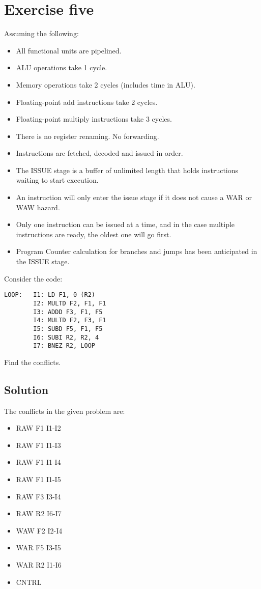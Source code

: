\section{Exercise five}

Assuming the following:
\begin{itemize}
    \item All functional units are pipelined.
    \item ALU operations take 1 cycle.
    \item Memory operations take 2 cycles (includes time in ALU).
    \item Floating-point add instructions take 2 cycles.
    \item Floating-point multiply instructions take 3 cycles.
    \item There is no register renaming. No forwarding.
    \item Instructions are fetched, decoded and issued in order.
    \item The ISSUE stage is a buffer of unlimited length that holds instructions waiting to start execution.
    \item An instruction will only enter the issue stage if it does not cause a WAR or WAW hazard.
    \item Only one instruction can be issued at a time, and in the case multiple instructions are ready, the oldest one will go first.
    \item Program Counter calculation for branches and jumps has been anticipated in the ISSUE stage.
\end{itemize}
Consider the code:
\begin{verbatim}
LOOP:   I1: LD F1, 0 (R2)
        I2: MULTD F2, F1, F1
        I3: ADDD F3, F1, F5
        I4: MULTD F2, F3, F1
        I5: SUBD F5, F1, F5
        I6: SUBI R2, R2, 4
        I7: BNEZ R2, LOOP
\end{verbatim}
Find the conflicts.

\subsection*{Solution}
The conflicts in the given problem are: 
\begin{itemize}
    \item RAW F1 I1-I2
    \item RAW F1 I1-I3
    \item RAW F1 I1-I4
    \item RAW F1 I1-I5
    \item RAW F3 I3-I4
    \item RAW R2 I6-I7
    \item WAW F2 I2-I4
    \item WAR F5 I3-I5
    \item WAR R2 I1-I6
    \item CNTRL
\end{itemize}